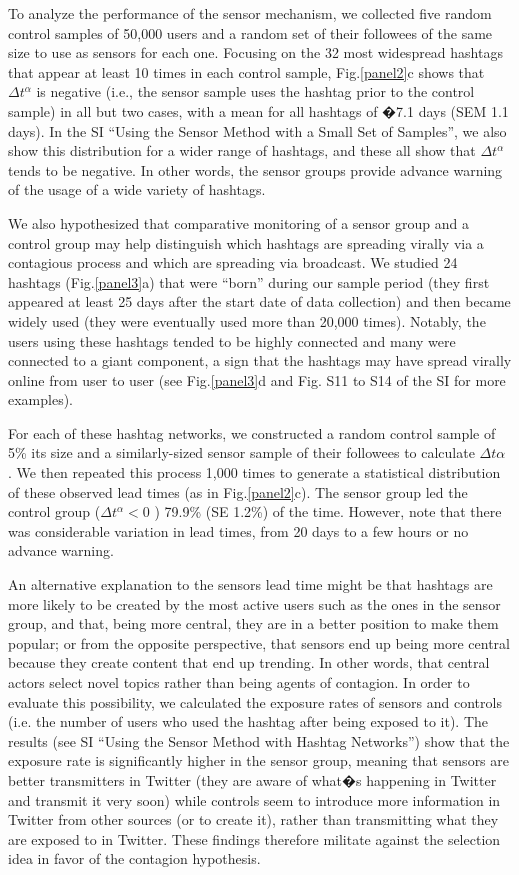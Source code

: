 To analyze the performance of the sensor mechanism, we collected five random control samples of 50,000 users and a random set of their followees of the same size to use as sensors for each one.  Focusing on the 32 most widespread hashtags that appear at least 10 times in each control sample, Fig.\ref{panel2}c shows that $\Delta t^\alpha$  is negative (i.e., the sensor sample uses the hashtag prior to the control sample) in all but two cases, with a mean for all hashtags of �7.1 days (SEM 1.1 days).  In the SI ``Using the Sensor Method with a Small Set of Samples'', we also show this distribution for a wider range of hashtags, and these all show that $\Delta t^\alpha$  tends to be negative.  In other words, the sensor groups provide advance warning of the usage of a wide variety of hashtags.

We also hypothesized that comparative monitoring of a sensor group and a control group may help distinguish which hashtags are spreading virally via a contagious process and which are spreading via broadcast.  We studied 24 hashtags (Fig.\ref{panel3}a) that were ``born'' during our sample period (they first appeared at least 25 days after the start date of data collection) and then became widely used (they were eventually used more than 20,000 times).  Notably, the users using these hashtags tended to be highly connected and many were connected to a giant component, a sign that the hashtags may have spread virally online from user to user (see Fig.\ref{panel3}d and Fig. S11 to S14 of the SI for more examples). 

For each of these hashtag networks, we constructed a random control sample of 5\% its size and a similarly-sized sensor sample of their followees to calculate $\Delta t\alpha$ .  We then repeated this process 1,000 times to generate a statistical distribution of these observed lead times (as in Fig.\ref{panel2}c).  The sensor group led the control group ($\Delta t^\alpha < 0$  ) 79.9\% (SE 1.2\%) of the time.  However, note that there was considerable variation in lead times, from 20 days to a few hours or no advance warning.  

An alternative explanation to the sensors lead time might be that hashtags are more likely to be created by the most active users such as the ones in the sensor group, and that, being more central, they are in a better position to make them popular; or from the opposite perspective, that sensors end up being more central because they create content that end up trending. In other words, that central actors select novel topics rather than being agents of contagion. In order to evaluate this possibility, we calculated the exposure rates of sensors and controls (i.e. the number of users who used the hashtag after being exposed to it). The results (see SI ``Using the Sensor Method with Hashtag Networks'') show that the exposure rate is significantly higher in the sensor group, meaning  that sensors are better transmitters in Twitter (they are aware of what�s happening in Twitter and transmit it very soon) while controls seem to introduce more information in Twitter from other sources (or to create it), rather than transmitting what they are exposed to in Twitter. These findings therefore militate against the selection idea in favor of the contagion hypothesis. 

